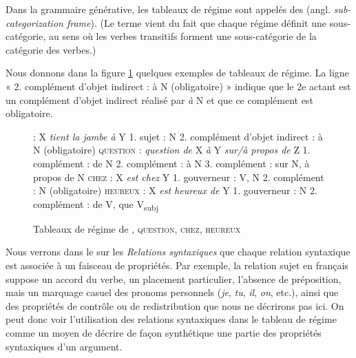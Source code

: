 Dans la grammaire générative, les tableaux de régime sont appelés des  (angl. \textit{sub-categorization frame}). (Le terme vient du fait que chaque régime définit une sous-catégorie, au sens où les verbes transitifs forment une sous-catégorie de la catégorie des verbes.)

Nous donnons dans la figure \ref{fig:13-regime} quelques exemples de tableaux de régime. La ligne « 2. complément d’objet indirect : à N (obligatoire) » indique que le 2e actant est un complément d’objet indirect réalisé par \textit{à} N et que ce complément est obligatoire.

\begin{figure}

 : X \textit{tient la jambe à} Y
1. sujet : N
2. complément d’objet indirect : à N (obligatoire)
\textsc{question} : \textit{question de} X \textit{à }Y \textit{sur/à propos de} Z
1. complément : de N
2. complément : à N
3. complément : sur N, à propos de N
\textsc{chez} : X \textit{est chez} Y
1. gouverneur : V, N
2. complément : N (obligatoire)
\textsc{heureux} : X \textit{est heureux de} Y
1. gouverneur : N
2. complément : de V, que V\textsubscript{subj}
\caption{Tableaux de régime de , \textsc{question}, \textsc{chez}, \textsc{heureux}\label{fig:13-regime}}
\end{figure}

Nous verrons dans le  sur les \textit{Relations syntaxiques} que chaque relation syntaxique est associée à un faisceau de propriétés. Par exemple, la relation sujet en français suppose un accord du verbe, un placement particulier, l’absence de préposition, mais un marquage casuel des pronoms personnels (\textit{je}, \textit{tu}, \textit{il}, \textit{on}, etc.), ainsi que des propriétés de contrôle ou de redistribution que nous ne décrirons pas ici. On peut donc voir l’utilisation des relations syntaxiques dans le tableau de régime comme un moyen de décrire de façon synthétique une partie des propriétés syntaxiques d’un argument.

